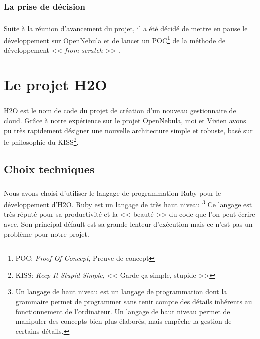 \subsection{La prise de décision}
\paragraph*{}
Suite à la réunion d'avancement du projet, il a été décidé de mettre en pause le développement sur OpenNebula et de lancer un
POC\footnote{POC: \emph{Proof Of Concept}, Preuve de concept} de la méthode de développement << \emph{from scratch} >> .



\chapter{Le projet H2O}
\paragraph*{}
H2O est le nom de code du projet de création d'un nouveau gestionnaire de cloud.
Grâce à notre expérience sur le projet OpenNebula, moi et Vivien avons pu très rapidement désigner une nouvelle architecture
simple et robuste, basé sur le philosophie du KISS\footnote{KISS: \emph{Keep It Stupid Simple}, << Garde ça simple, stupide >>}.


\section{Choix techniques}
\paragraph*{}
Nous avons choisi d'utiliser le langage de programmation Ruby pour le développement d'H2O. Ruby est un langage de très haut niveau
\footnote{Un langage de haut niveau est un langage de programmation dont la grammaire permet de programmer sans tenir compte des détails inhérents au
fonctionnement de l'ordinateur. Un langage de haut niveau permet de manipuler des concepts bien plus élaborés, mais empêche la gestion de certains détails.}
Ce langage est très réputé pour sa productivité et la << beauté >> du code que l'on peut écrire avec. Son principal défault est sa grande lenteur d'exécution
mais ce n'est pas un problème pour notre projet.

